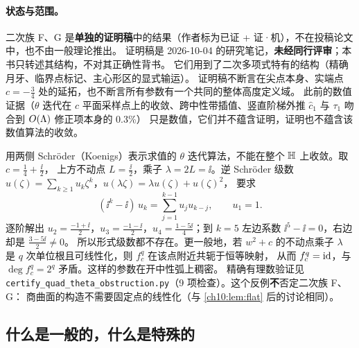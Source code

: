 \paragraph{状态与范围。}二次族 F、G 是\textbf{单独的证明稿}中的结果（作者标为已证 + 证·机），不在投稿论文中，也不由一般理论推出。
证明稿是 2026-10-04 的研究笔记，\textbf{未经同行评审}；本书只转述其结构，不对其正确性背书。
它们用到了二次多项式特有的结构（精确月牙、临界点标记、主心形区的显式输运）。
证明稿不断言在尖点本身、实端点 $c=-\tfrac34$ 处的延拓，也不断言所有参数有一个共同的整体高度定义域。
此前的数值证据（$\theta$ 迭代在 $c$ 平面采样点上的收敛、跨中性带插值、竖直阶梯外推 $\hat c_1$ 与 $\tau_1$ 吻合到 $O(\Lambda)$ 修正项本身的 0.3\%）
只是数值，它们并不蕴含证明，证明也不蕴含该数值算法的收敛。

\begin{example}\label{ch10:ex:theta-obstruction}
用两侧 Schröder（Koenigs）表示求值的 $\theta$ 迭代算法，不能在整个 $\mathbb{H}$ 上收敛。取 $c=\tfrac14+\tfrac\ii2$，
上方不动点 $L=\tfrac\ii2$，乘子 $\lambda=2L=\ii$。逆 Schröder 级数 $u(\zeta)=\sum_{k\ge1}u_k\zeta^k$，$u(\lambda\zeta)=\lambda u(\zeta)+u(\zeta)^2$，
要求
\[
  (\ii^k-\ii)\,u_k=\sum_{j=1}^{k-1}u_ju_{k-j},\qquad u_1=1 .
\]
逐阶解出 $u_2=\tfrac{-1+\ii}2$，$u_3=\tfrac{-1-\ii}2$，$u_4=\tfrac{1-5\ii}4$；到 $k=5$ 左边系数 $\ii^5-\ii=0$，右边却是 $\tfrac{3-5\ii}2\neq0$。
所以形式级数都不存在。更一般地，若 $w^2+c$ 的不动点乘子 $\lambda$ 是 $q$ 次单位根且可线性化，则 $f_c^q$ 在该点附近共轭于恒等映射，
从而 $f_c^q=\mathrm{id}$，与 $\deg f_c^q=2^q$ 矛盾。这样的参数在开中性弧上稠密。
精确有理数验证见 \texttt{certify\_quad\_theta\_obstruction.py}（9 项检查）。这个反例\textbf{不}否定二次族 F、G：
商曲面的构造不需要固定点的线性化（与 \cref{ch10:lem:flat} 后的讨论相同）。
\end{example}

\subsection{什么是一般的，什么是特殊的}

